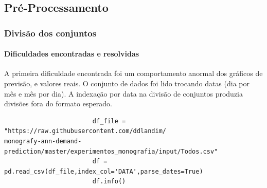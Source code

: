\documentclass[	12pt, Times, openright, twoside, a4paper, english, brazil]{abntex2}
\begin{document}
	    \subsection{Pré-Processamento}
    	    \subsubsection{Divisão dos conjuntos}
    	        \paragraph{Dificuldades encontradas e resolvidas}
    	            A primeira dificuldade encontrada foi um comportamento anormal dos gráficos de previsão, e valores reais. O conjunto de dados foi lido trocando datas (dia por mês e mês por dia). A indexação por data na divisão de conjuntos produzia divisões fora do formato esperado.\newline
    	            \begin{lstlisting}
    	                df_file = "https://raw.githubusercontent.com/ddlandim/                                     monografy-ann-demand-prediction/master/experimentos_monografia/input/Todos.csv"
                        df = pd.read_csv(df_file,index_col='DATA',parse_dates=True)
                        df.info()
    	            \end{lstlisting}
    	            
\end{document}
